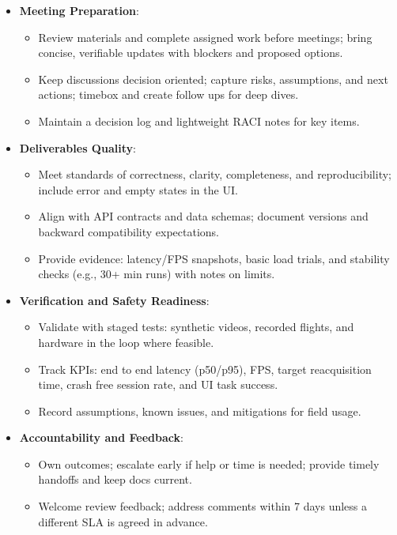 \documentclass{article}
\begin{document}
\begin{itemize}
  \item \textbf{Meeting Preparation}:
        \begin{itemize}
          \item Review materials and complete assigned work before meetings; bring concise,
                verifiable updates with blockers and proposed options.
          \item Keep discussions decision oriented; capture risks, assumptions, and next
                actions; timebox and create follow ups for deep dives.
          \item Maintain a decision log and lightweight RACI notes for key items.
        \end{itemize}

  \item \textbf{Deliverables Quality}:
        \begin{itemize}
          \item Meet standards of correctness, clarity, completeness, and reproducibility;
                include error and empty states in the UI.
          \item Align with API contracts and data schemas; document versions and backward
                compatibility expectations.
          \item Provide evidence: latency/FPS snapshots, basic load trials, and stability
                checks (e.g., 30+ min runs) with notes on limits.
        \end{itemize}

  \item \textbf{Verification and Safety Readiness}:
        \begin{itemize}
          \item Validate with staged tests: synthetic videos, recorded flights, and hardware in
                the loop where feasible.
          \item Track KPIs: end to end latency (p50/p95), FPS, target reacquisition time, crash
                free session rate, and UI task success.
          \item Record assumptions, known issues, and mitigations for field usage.
        \end{itemize}

  \item \textbf{Accountability and Feedback}:
        \begin{itemize}
          \item Own outcomes; escalate early if help or time is needed; provide timely handoffs
                and keep docs current.
          \item Welcome review feedback; address comments within 7 days unless a different SLA
                is agreed in advance.
        \end{itemize}

\end{itemize}
\end{document}
